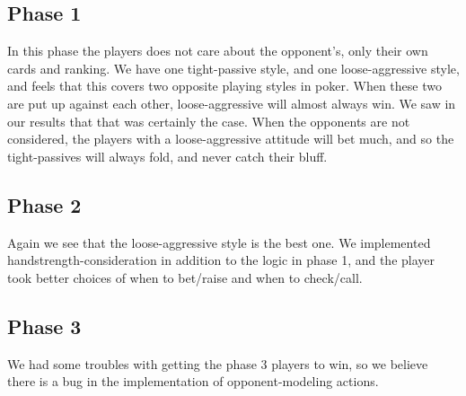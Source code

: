 \documentclass[a4paper, 12pt]{article}
\begin{document}
\subsection{Phase 1}
In this phase the players does not care about the opponent's, only their own cards and ranking. We have one tight-passive style, and one loose-aggressive style, and feels that this covers two opposite playing styles in poker. When these two are put up against each other, loose-aggressive will almost always win. We saw in our results that that was certainly the case. When the opponents are not considered, the players with a loose-aggressive attitude will bet much, and so the tight-passives will always fold, and never catch their bluff.

\subsection{Phase 2}
Again we see that the loose-aggressive style is the best one. We implemented handstrength-consideration in addition to the logic in phase 1, and the player took better choices of when to bet/raise and when to check/call. 

\subsection{Phase 3}
We had some troubles with getting the phase 3 players to win, so we believe there is a bug in the implementation of opponent-modeling actions.
\end{document}
